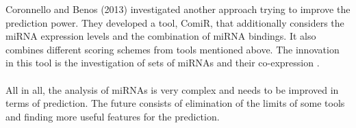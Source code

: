 \documentclass[11pt, a4paper, oneside]{book}
\begin{document}
Coronnello and Benos (2013) investigated another approach trying to improve the prediction power. They developed a tool, ComiR, that additionally considers the miRNA expression levels and the combination of miRNA bindings. It also combines different scoring schemes from tools mentioned above. The innovation in this tool is the investigation of sets of miRNAs and their co-expression \cite{Coronnello}. \\\\

All in all, the analysis of miRNAs is very complex and needs to be improved in terms of prediction. The future consists of elimination of the limits of some tools and finding more useful features for the prediction.






\listoffigures
\listoftables




\end{document}
